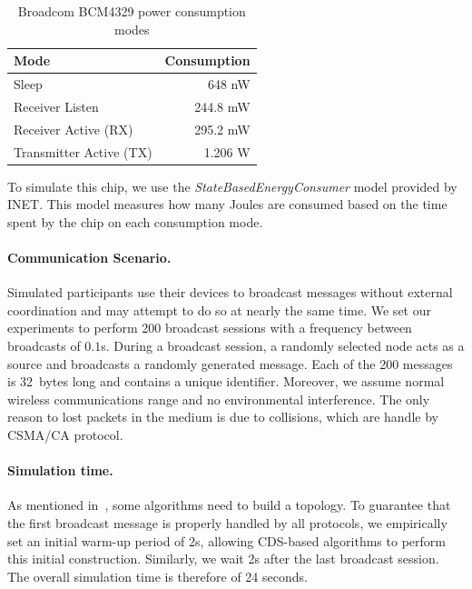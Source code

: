 \begin{table}[ht]
	\footnotesize
	\centering
	
	\begin{tabular}{lr}
		\textbf{Mode} & \textbf{Consumption} \\
		
		\midrule
		Sleep  & 648 nW \\ 
		Receiver Listen & 244.8 mW \\
		Receiver Active (RX) & 295.2 mW \\
		Transmitter Active (TX) & 1.206 W \\
	\end{tabular}
	
	\caption{Broadcom BCM4329 power consumption modes}
\end{table}

%
To simulate this chip, we use the \emph{StateBasedEnergyConsumer} model provided by INET.
%
This model measures how many Joules are consumed based on the time spent by the chip  on each consumption mode.


\paragraph{Communication Scenario.}
Simulated participants use their devices to broadcast messages without external coordination and may attempt to do so at nearly the same time.
%
We set our experiments to perform 200 broadcast sessions with a frequency between broadcasts of $0.1$s.
%
During a broadcast session, a randomly selected node acts as a source and broadcasts a randomly generated message.
%
Each of the 200 messages is 32~bytes long and contains a unique identifier.
%
Moreover, we assume normal wireless communications range and no environmental interference.
%
The only reason to lost packets in the medium is due to collisions, which are handle by CSMA/CA protocol.

\paragraph{Simulation time.}
As mentioned in~, some algorithms need to build a topology.
%
To guarantee that the first broadcast message is properly handled by all protocols, we empirically set an initial warm-up period of 2s, allowing CDS-based algorithms to perform this initial construction.
%
Similarly, we  wait 2s after the last broadcast session.
%
The overall simulation time is therefore of 24 seconds.


